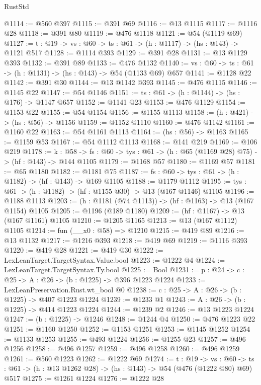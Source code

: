 \begin{lexlean}{RustStd}
\begin{coremodule}
@1114 := @560 @397
@1115 := @391 @69
@1116 := @13 @1115
@1117 := @1116 @28
@1118 := @391 @80
@1119 := @476 @1118
@1121 := @54 (@1119 @69)
@1127 := {t : @19} -> {vs : @60} -> {ts : @61} -> (h : @1117) -> (hs : @143) -> @1121 @517
@1128 := @1114 @393
@1129 := @391 @28
@1131 := @13 @1129 @393
@1132 := @391 @89
@1133 := @476 @1132
@1140 := {vs : @60} -> {ts : @61} -> (h : @1131) -> (hs : @143) -> @54 (@1133 @69) @657
@1141 := @1128 @22
@1142 := @391 @30
@1144 := @13 @1142 @393
@1145 := @476 @1115
@1146 := @1145 @22
@1147 := @54 @1146
@1151 := {ts : @61} -> (h : @1144) -> (hs : @176) -> @1147 @657
@1152 := @1141 @23
@1153 := @476 @1129
@1154 := @1153 @22
@1155 := @54 @1154
@1156 := @1155 @1113
@1158 := (h : @421) -> (hs : @56) -> @1156
@1159 := @1152 @1110
@1160 := @476 @1142
@1161 := @1160 @22
@1163 := @54 @1161 @1113
@1164 := (hs : @56) -> @1163
@1165 := @1159 @53
@1167 := @54 @1112 @1113
@1168 := @141 @219
@1169 := @106 @219
@1178 := {k : @58} ->
  {fs : @60} -> {tys : @61} -> (h : @65 (@1169 @28) @75) -> (hf : @143) -> @144 @1105
@1179 := @1168 @57
@1180 := @1169 @57
@1181 := @65 @1180
@1182 := @1181 @75
@1187 := {fs : @60} -> {tys : @61} -> (h : @1182) -> (hf : @143) -> @169 @1105
@1188 := @1179 @1112
@1195 := {tys : @61} -> (h : @1182) -> (hf : @1155 @30) -> @13 (@167 @1146) @1105
@1196 := @1188 @1113
@1203 := (h : @1181 (@74 @1113)) -> (hf : @1163) -> @13 (@167 @1154) @1105
@1205 := @1196 (@189 @1180)
@1209 := (hf : @1167) -> @13 (@167 @1161) @1105
@1210 := @1205 @1165
@1213 := @13 (@167 @1112) @1105
@1214 := fun (__x0 : @58) => @1210
@1215 := @419 @89
@1216 := @13 @1132
@1217 := @1216 @393
@1218 := @419 @69
@1219 := @1116 @393
@1220 := @419 @28
@1221 := @419 @30
@1222 := LexLeanTarget.TargetSyntax.Value.bool
@1223 := @1222 @4
@1224 := LexLeanTarget.TargetSyntax.Ty.bool
@1225 := Bool
@1231 := {p : @24} -> {c : @25} -> {A : @26} -> (b : @1225) -> @396 @1223 @1224
@1233 := LexLeanPreservation.Rust.wt_bool @0
@1238 := {c : @25} -> {A : @26} -> (b : @1225) -> @407 @1223 @1224
@1239 := @1233 @1
@1243 := {A : @26} -> (b : @1225) -> @414 @1223 @1224
@1244 := @1239 @2
@1246 := @13 @1223 @1224
@1247 := (b : @1225) -> @1246
@1248 := @1244 @4
@1250 := @476 @1223 @22
@1251 := @1160 @1250
@1252 := @1153 @1251
@1253 := @1145 @1252
@1254 := @1133 @1253
@1255 := @493 @1224
@1256 := @1255 @23
@1257 := @496 @1256
@1258 := @496 @1257
@1259 := @496 @1258
@1260 := @496 @1259
@1261 := @560 @1223
@1262 := @1222 @69
@1274 := {t : @19} ->
  {vs : @60} -> {ts : @61} -> (h : @13 @1262 @28) -> (hs : @143) -> @54 (@476 (@1222 @80) @69) @517
@1275 := @1261 @1224
@1276 := @1222 @28

\end{coremodule}
\end{lexlean}
